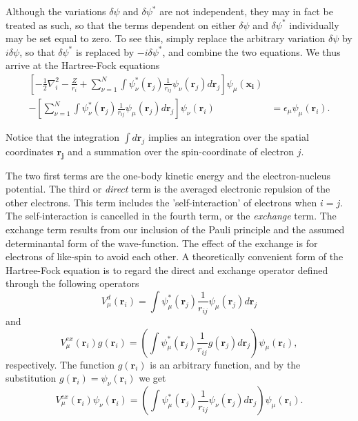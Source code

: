 Although the variations $\delta\psi$ and $\delta\psi^*$ are not
independent, they may in fact be treated as such, so that the 
terms dependent on either $\delta\psi$ and $\delta\psi^*$ individually 
may be set equal to zero. To see this, simply 
replace the arbitrary variation $\delta\psi$ by $i\delta\psi$, so that
$\delta\psi^*$ is replaced by $-i\delta\psi^*$, and combine the two
equations. We thus arrive at the Hartree-Fock equations
\begin{equation}
  \begin{split}
    \left[ -\frac{1}{2}\nabla_i^2-\frac{Z}{r_i} + \sum_{{\nu}=1}^N
      \int \psi_{\nu}^*(\mathbf{r}_j)\frac{1}{r_{ij}}
      \psi_{\nu}(\mathbf{r}_j)d\mathbf{r}_j \right]
    \psi_{\mu}(\mathbf{x_i})  & \\
    - \left[ \sum_{{\nu}=1}^N \int
      \psi_{\nu}^*(\mathbf{r}_j) 
      \frac{1}{r_{ij}}\psi_{\mu}(\mathbf{r}_j) d\mathbf{r}_j
      \right] \psi_{\nu}(\mathbf{r}_i)  & 
  = \epsilon_{\mu} \psi_{\mu}(\mathbf{r}_i).
  \end{split}
\label{HartreeFock}
\end{equation}

Notice that the integration $\int d\mathbf{r}_j$ implies an
integration over the spatial coordinates $\mathbf{r_j}$ and a summation
over the spin-coordinate of electron $j$.

The two first terms are the one-body kinetic energy and the
electron-nucleus potential. The third or
\emph{direct} term is the averaged electronic repulsion of the other
electrons. This
term includes the 'self-interaction' of 
electrons when $i=j$. The self-interaction is cancelled in the fourth
term, or the \emph{exchange} term. The exchange term results from our
inclusion of the Pauli principle and the assumed determinantal form of
the wave-function. The effect of the exchange is for electrons of
like-spin to avoid each other.  A theoretically convenient form of the
Hartree-Fock equation is to regard the direct and exchange operator
defined through the following operators
\begin{equation}
  V_{\mu}^{d}(\mathbf{r}_i) = \int \psi_{\mu}^*(\mathbf{r}_j) 
  \frac{1}{r_{ij}}\psi_{\mu}(\mathbf{r}_j) d\mathbf{r}_j
\end{equation}
and
\begin{equation}
  V_{\mu}^{ex}(\mathbf{r}_i) g(\mathbf{r}_i) 
  = \left(\int \psi_{\mu}^*(\mathbf{r}_j) 
  \frac{1}{r_{ij}}g(\mathbf{r}_j) d\mathbf{r}_j
  \right)\psi_{\mu}(\mathbf{r}_i),
\end{equation}
respectively. The function $g(\mathbf{r}_i)$ is an arbitrary function,
and by the substitution $g(\mathbf{r}_i) = \psi_{\nu}(\mathbf{r}_i)$
we get
\begin{equation}
  V_{\mu}^{ex}(\mathbf{r}_i) \psi_{\nu}(\mathbf{r}_i) 
  = \left(\int \psi_{\mu}^*(\mathbf{r}_j) 
  \frac{1}{r_{ij}}\psi_{\nu}(\mathbf{r}_j)
  d\mathbf{r}_j\right)\psi_{\mu}(\mathbf{r}_i).
\end{equation}

